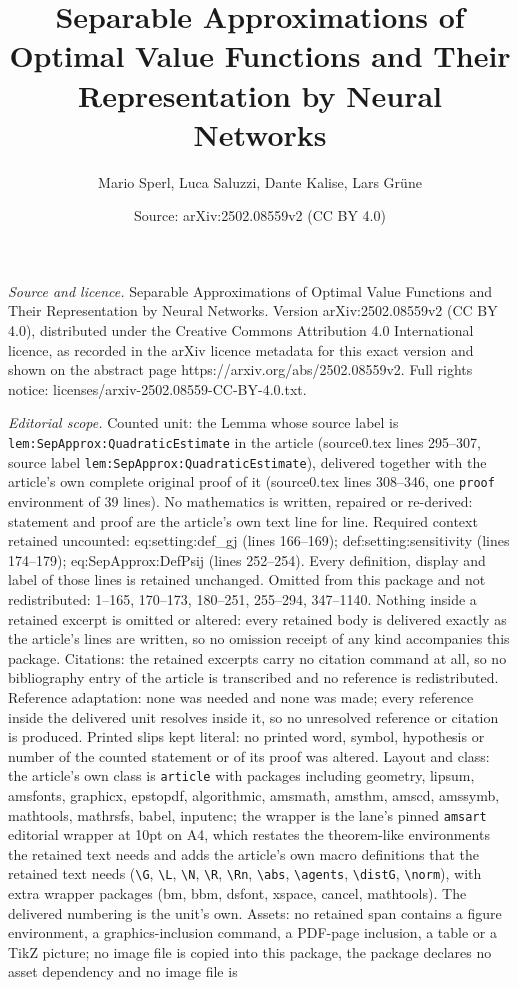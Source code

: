 \documentclass[10pt,a4paper]{amsart}
\title[Separable Approximations of Optimal Value Functions and Thei]{Separable Approximations of Optimal Value Functions and Their Representation by Neural Networks}
\author{Mario Sperl, Luca Saluzzi, Dante Kalise, Lars Gr\"une}
\date{Source: arXiv:2502.08559v2 (CC BY 4.0)}
\begin{document}
\maketitle

\noindent\emph{Source and licence.} Separable Approximations of Optimal Value Functions and Their Representation by Neural Networks. Version arXiv:2502.08559v2 (CC BY 4.0), distributed under the Creative Commons Attribution 4.0 International licence, as recorded in the arXiv licence metadata for this exact version and shown on the abstract page https://arxiv.org/abs/2502.08559v2. Full rights notice: licenses/arxiv-2502.08559-CC-BY-4.0.txt.\par\smallskip

\noindent\textit{Editorial scope.} Counted unit: the Lemma whose source label is \texttt{lem:SepApprox:QuadraticEstimate} in the article (source0.tex lines 295--307, source label \texttt{lem:SepApprox:QuadraticEstimate}), delivered together with the article's own complete original proof of it (source0.tex lines 308--346, one \texttt{proof} environment of 39 lines). No mathematics is written, repaired or re-derived: statement and proof are the article's own text line for line. Required context retained uncounted: eq:setting:def\_gj (lines 166--169); def:setting:sensitivity (lines 174--179); eq:SepApprox:DefPsij (lines 252--254). Every definition, display and label of those lines is retained unchanged. Omitted from this package and not redistributed: 1--165, 170--173, 180--251, 255--294, 347--1140. Nothing inside a retained excerpt is omitted or altered: every retained body is delivered exactly as the article's lines are written, so no omission receipt of any kind accompanies this package. Citations: the retained excerpts carry no citation command at all, so no bibliography entry of the article is transcribed and no reference is redistributed. Reference adaptation: none was needed and none was made; every reference inside the delivered unit resolves inside it, so no unresolved reference or citation is produced. Printed slips kept literal: no printed word, symbol, hypothesis or number of the counted statement or of its proof was altered. Layout and class: the article's own class is \texttt{article} with packages including geometry, lipsum, amsfonts, graphicx, epstopdf, algorithmic, amsmath, amsthm, amscd, amssymb, mathtools, mathrsfs, babel, inputenc; the wrapper is the lane's pinned \texttt{amsart} editorial wrapper at 10pt on A4, which restates the theorem-like environments the retained text needs and adds the article's own macro definitions that the retained text needs (\texttt{\textbackslash G}, \texttt{\textbackslash L}, \texttt{\textbackslash N}, \texttt{\textbackslash R}, \texttt{\textbackslash Rn}, \texttt{\textbackslash abs}, \texttt{\textbackslash agents}, \texttt{\textbackslash distG}, \texttt{\textbackslash norm}), with extra wrapper packages (bm, bbm, dsfont, xspace, cancel, mathtools). The delivered numbering is the unit's own. Assets: no retained span contains a figure environment, a graphics-inclusion command, a PDF-page inclusion, a table or a TikZ picture; no image file is copied into this package, the package declares no asset dependency and no image file is 
\end{document}

